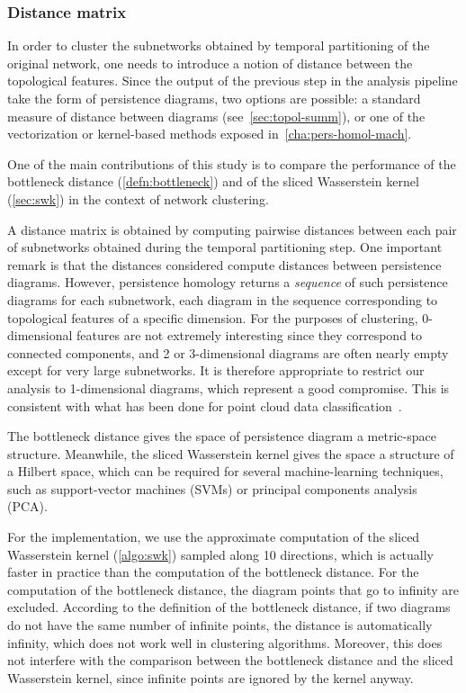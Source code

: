 \documentclass[a4paper,11pt,openany,extrafontsizes]{memoir}
\begin{document}
\subsubsection{Distance matrix}%
\label{sec:distance-matrix}

In order to cluster the subnetworks obtained by temporal partitioning
of the original network, one needs to introduce a notion of distance
between the topological features. Since the output of the previous
step in the analysis pipeline take the form of persistence diagrams,
two options are possible: a standard measure of distance between
diagrams (see~\autoref{sec:topol-summ}), or one of the vectorization
or kernel-based methods exposed in~\autoref{cha:pers-homol-mach}.

One of the main contributions of this study is to compare the
performance of the bottleneck distance (\autoref{defn:bottleneck}) and
of the sliced Wasserstein kernel (\autoref{sec:swk}) in the context of
network clustering.

A distance matrix is obtained by computing pairwise distances between
each pair of subnetworks obtained during the temporal partitioning
step. One important remark is that the distances considered compute
distances between persistence diagrams. However, persistence homology
returns a \emph{sequence} of such persistence diagrams for each
subnetwork, each diagram in the sequence corresponding to topological
features of a specific dimension. For the purposes of clustering,
0-dimensional features are not extremely interesting since they
correspond to connected components, and 2 or 3-dimensional diagrams
are often nearly empty except for very large subnetworks. It is
therefore appropriate to restrict our analysis to 1-dimensional
diagrams, which represent a good compromise. This is consistent with
what has been done for point cloud data
classification~\cite{carriere_sliced_2017}.

The bottleneck distance gives the space of persistence diagram a
metric-space structure. Meanwhile, the sliced Wasserstein kernel gives
the space a structure of a Hilbert space, which can be required
for several machine-learning techniques, such as support-vector
machines (SVMs) or principal components analysis (PCA).

For the implementation, we use the approximate computation of the
sliced Wasserstein kernel (\autoref{algo:swk}) sampled along 10
directions, which is actually faster in practice than the computation
of the bottleneck distance. For the computation of the bottleneck
distance, the diagram points that go to infinity are
excluded. According to the definition of the bottleneck distance, if
two diagrams do not have the same number of infinite points, the
distance is automatically infinity, which does not work well in
clustering algorithms. Moreover, this does not interfere with the
comparison between the bottleneck distance and the sliced Wasserstein
kernel, since infinite points are ignored by the kernel anyway.
\end{document}

